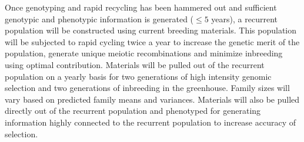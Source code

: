 \documentclass[11pt]{article}
\begin{document}

Once genotyping and rapid recycling has been hammered out and sufficient genotypic and phenotypic information is generated ($\leq 5$ years), a recurrent population will be constructed using current breeding materials. This population will be subjected to rapid cycling twice a year to increase the genetic merit of the population, generate unique meiotic recombinations and minimize inbreeding using optimal contribution. Materials will be pulled out of the recurrent population on a yearly basis for two generations of high intensity genomic selection and two generations of inbreeding in the greenhouse. Family sizes will vary based on predicted family means and variances. Materials will also be pulled directly out of the recurrent population and phenotyped for generating information highly connected to the recurrent population to increase accuracy of selection. 








\end{document}
